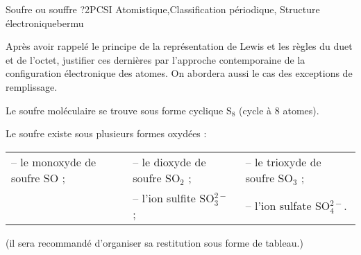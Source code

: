 
\begin{exercise}{Soufre ou souffre ?}{2}{PCSI}
{Atomistique,Classification périodique, Structure électronique}{bermu}


\begin{questions}
    \questioncours Après avoir rappelé le principe de la représentation de Lewis et les règles du duet et de l'octet, justifier ces dernières par l'approche contemporaine de la configuration électronique des atomes. On abordera aussi le cas des exceptions de remplissage.
    

    \question Le soufre moléculaire se trouve sous forme cyclique S$_8$ (cycle à 8 atomes).
    
    \question Le soufre existe sous plusieurs formes oxydées : \\
    \begin{tabular}{lll}
        -- le monoxyde de soufre SO ; & -- le dioxyde de soufre SO$_2$ ; & -- le trioxyde de soufre SO$_3$ ; \\
       & -- l'ion sulfite SO$_3^{2-}$ ; & -- l'ion sulfate SO$_4^{2-}$.
    \end{tabular}
    
    (il sera recommandé d'organiser sa restitution sous forme de tableau.)
\end{questions}
\end{exercise}
